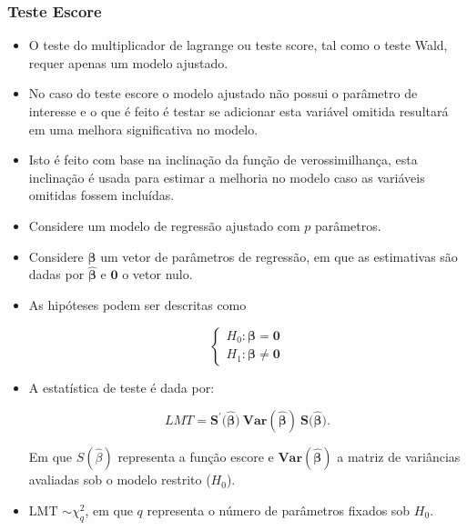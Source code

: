 \documentclass[10pt,
  aspectratio=169,
  serif,
  mathserif,
  professionalfont,
  compress,
  handout,
  ]{beamer}\usepackage[]{graphicx}\usepackage[]{color}
\begin{document}

\begin{frame}
  \frametitle{Teste Escore}

  \begin{itemize}
    \itemsep 2ex

  \item O teste do multiplicador de lagrange ou teste score, tal como o teste Wald, requer apenas um modelo ajustado. 
  
  \item No caso do teste escore o modelo ajustado não possui o parâmetro de interesse e o que é feito é testar se adicionar esta variável omitida resultará em uma melhora significativa no modelo. 

  \item Isto é feito com base na inclinação da função de verossimilhança, esta inclinação é usada para estimar a melhoria no modelo caso as variáveis omitidas fossem incluídas. 

  \end{itemize}

\end{frame}


\begin{frame}

\begin{itemize}
  \itemsep 2ex

  \item Considere um modelo de regressão ajustado com $p$ parâmetros.
  
  \item Considere $\boldsymbol{\beta}$ um vetor de parâmetros de regressão, em que as estimativas são dadas por $\boldsymbol{\hat\beta}$ e $\boldsymbol{0}$ o vetor nulo.
  
  \item As hipóteses podem ser descritas como

$$
\left\{\begin{matrix}
H_0: \boldsymbol{\beta} = \boldsymbol{0} \\ 
H_1: \boldsymbol{\beta} \neq \boldsymbol{0}
\end{matrix}\right.
$$

  \item A estatística de teste é dada por:

$$ LMT = \boldsymbol{S^{'}(\hat\beta}) \ \boldsymbol{Var(\hat\beta)} \ \boldsymbol{S(\hat\beta}).$$

Em que $S(\hat\beta)$ representa a função escore e $\boldsymbol{Var(\hat\beta)}$ a matriz de variâncias avaliadas sob o modelo restrito ($H_0$).

 \item  LMT $\sim \chi^2_q$, em que $q$ representa o número de parâmetros fixados sob $H_0$.

\end{itemize}

\end{frame}
\end{document}
